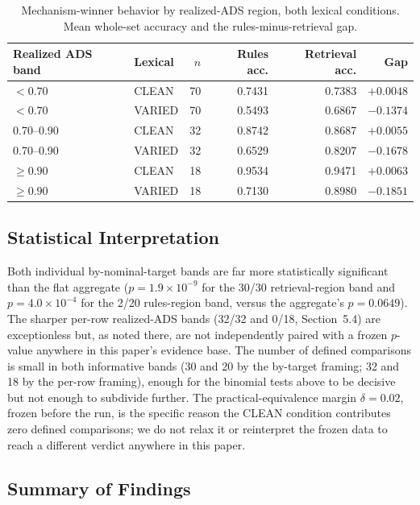 \documentclass[11pt]{article}
\begin{document}
\begin{table}[htbp]
\centering
\caption{Mechanism-winner behavior by realized-ADS region, both lexical
conditions. Mean whole-set accuracy and the rules-minus-retrieval gap.}
\label{tab:band-behavior}
\begin{tabular}{llrrrr}
\toprule
Realized ADS band & Lexical & $n$ & Rules acc. & Retrieval acc. & Gap \\
\midrule
$<0.70$ & CLEAN & 70 & 0.7431 & 0.7383 & $+0.0048$ \\
$<0.70$ & VARIED & 70 & 0.5493 & 0.6867 & $-0.1374$ \\
0.70--0.90 & CLEAN & 32 & 0.8742 & 0.8687 & $+0.0055$ \\
0.70--0.90 & VARIED & 32 & 0.6529 & 0.8207 & $-0.1678$ \\
$\geq0.90$ & CLEAN & 18 & 0.9534 & 0.9471 & $+0.0063$ \\
$\geq0.90$ & VARIED & 18 & 0.7130 & 0.8980 & $-0.1851$ \\
\bottomrule
\end{tabular}
\end{table}

\subsection{Statistical Interpretation}
\label{sec:results-statistics}

Both individual by-nominal-target bands are far more statistically
significant than the flat aggregate ($p=1.9\times10^{-9}$ for the 30/30
retrieval-region band and $p=4.0\times10^{-4}$ for the 2/20 rules-region
band, versus the aggregate's $p=0.0649$). The sharper per-row realized-ADS
bands (32/32 and 0/18, Section~5.4) are exceptionless but, as noted there,
are not independently paired with a frozen $p$-value anywhere in this
paper's evidence base. The number of defined comparisons is small in both
informative bands (30 and 20 by the by-target framing; 32 and 18 by the
per-row framing), enough for the binomial tests above to be decisive but not
enough to subdivide further. The
practical-equivalence margin $\delta=0.02$, frozen before the run, is the
specific reason the CLEAN condition contributes zero defined comparisons; we
do not relax it or reinterpret the frozen data to reach a different verdict
anywhere in this paper.

\subsection{Summary of Findings}
\label{sec:results-summary}
\end{document}
